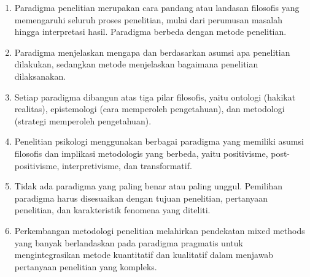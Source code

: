 \documentclass[
  indonesian,
  letterpaper,
  DIV=11,
  numbers=noendperiod]{scrreprt}
\providecommand{\tightlist}{%
  \setlength{\itemsep}{0pt}\setlength{\parskip}{0pt}}
\begin{document}
\begin{tcolorbox}[enhanced jigsaw, colframe=quarto-callout-tip-color-frame, toptitle=1mm, breakable, leftrule=.75mm, arc=.35mm, toprule=.15mm, colback=white, colbacktitle=quarto-callout-tip-color!10!white, bottomtitle=1mm, bottomrule=.15mm, titlerule=0mm, title=\textcolor{quarto-callout-tip-color}{\faLightbulb}\hspace{0.5em}{Rangkuman}, coltitle=black, left=2mm, opacitybacktitle=0.6, opacityback=0, rightrule=.15mm]

\begin{enumerate}
\def\labelenumi{\arabic{enumi}.}
\tightlist
\item
  Paradigma penelitian merupakan cara pandang atau landasan filosofis
  yang memengaruhi seluruh proses penelitian, mulai dari perumusan
  masalah hingga interpretasi hasil. Paradigma berbeda dengan metode
  penelitian.
\item
  Paradigma menjelaskan mengapa dan berdasarkan asumsi apa penelitian
  dilakukan, sedangkan metode menjelaskan bagaimana penelitian
  dilaksanakan.
\item
  Setiap paradigma dibangun atas tiga pilar filosofis, yaitu ontologi
  (hakikat realitas), epistemologi (cara memperoleh pengetahuan), dan
  metodologi (strategi memperoleh pengetahuan).
\item
  Penelitian psikologi menggunakan berbagai paradigma yang memiliki
  asumsi filosofis dan implikasi metodologis yang berbeda, yaitu
  positivisme, post-positivisme, interpretivisme, dan transformatif.
\item
  Tidak ada paradigma yang paling benar atau paling unggul. Pemilihan
  paradigma harus disesuaikan dengan tujuan penelitian, pertanyaan
  penelitian, dan karakteristik fenomena yang diteliti.
\item
  Perkembangan metodologi penelitian melahirkan pendekatan mixed methods
  yang banyak berlandaskan pada paradigma pragmatis untuk
  mengintegrasikan metode kuantitatif dan kualitatif dalam menjawab
  pertanyaan penelitian yang kompleks.
\end{enumerate}

\end{tcolorbox}
\end{document}
